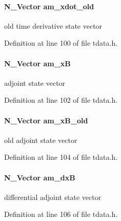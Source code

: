 \paragraph[{am\+\_\+xdot\+\_\+old}]{\setlength{\rightskip}{0pt plus 5cm}N\+\_\+\+Vector am\+\_\+xdot\+\_\+old}\label{struct_temp_data_a6a8af565a7f6ec58c4fbcd044c049d80}
old time derivative state vector 

Definition at line 100 of file tdata.\+h.

\hypertarget{struct_temp_data_a318f0b9b1f4b33326184a350912c6fb1}{}
\paragraph[{am\+\_\+x\+B}]{\setlength{\rightskip}{0pt plus 5cm}N\+\_\+\+Vector am\+\_\+x\+B}\label{struct_temp_data_a318f0b9b1f4b33326184a350912c6fb1}
adjoint state vector 

Definition at line 102 of file tdata.\+h.

\hypertarget{struct_temp_data_a33e09af3351a4d4889e62d0d0d964ce5}{}
\paragraph[{am\+\_\+x\+B\+\_\+old}]{\setlength{\rightskip}{0pt plus 5cm}N\+\_\+\+Vector am\+\_\+x\+B\+\_\+old}\label{struct_temp_data_a33e09af3351a4d4889e62d0d0d964ce5}
old adjoint state vector 

Definition at line 104 of file tdata.\+h.

\hypertarget{struct_temp_data_a6dc87d123304fe3c6a20899fca777501}{}
\paragraph[{am\+\_\+dx\+B}]{\setlength{\rightskip}{0pt plus 5cm}N\+\_\+\+Vector am\+\_\+dx\+B}\label{struct_temp_data_a6dc87d123304fe3c6a20899fca777501}
differential adjoint state vector 

Definition at line 106 of file tdata.\+h.

\hypertarget{struct_temp_data_ac4099b4f6bf1f15d7d07b88993515da7}{}
